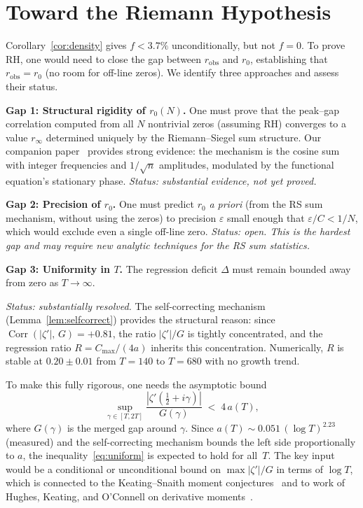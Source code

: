 \documentclass[11pt,a4paper]{article}
\DeclareMathOperator{\Corr}{Corr}
\begin{document}
\section{Toward the Riemann Hypothesis}

Corollary~\ref{cor:density} gives $f < 3.7\%$ unconditionally, but not $f = 0$.
To prove RH, one would need to close the gap between $r_{\mathrm{obs}}$ and $r_0$, establishing that $r_{\mathrm{obs}} = r_0$ (no room for off-line zeros).
We identify three approaches and assess their status.

\medskip
\noindent\textbf{Gap 1: Structural rigidity of $r_0(N)$.}
One must prove that the peak--gap correlation computed from all $N$ nontrivial zeros (assuming RH) converges to a value $r_\infty$ determined uniquely by the Riemann--Siegel sum structure.
Our companion paper~\cite{EigRigidity} provides strong evidence: the mechanism is the cosine sum with integer frequencies and $1/\sqrt{n}$ amplitudes, modulated by the functional equation's stationary phase.
\emph{Status: substantial evidence, not yet proved.}

\medskip
\noindent\textbf{Gap 2: Precision of $r_0$.}
One must predict $r_0$ \emph{a priori} (from the RS sum mechanism, without using the zeros) to precision $\varepsilon$ small enough that $\varepsilon / C < 1/N$, which would exclude even a single off-line zero.
\emph{Status: open.  This is the hardest gap and may require new analytic techniques for the RS sum statistics.}

\medskip
\noindent\textbf{Gap 3: Uniformity in $T$.}
The regression deficit $\Delta$ must remain bounded away from zero as $T \to \infty$.

\emph{Status: substantially resolved.}
The self-correcting mechanism (Lemma~\ref{lem:selfcorrect}) provides the structural reason: since $\Corr(|\zeta'|,\, G) = +0.81$, the ratio $|\zeta'|/G$ is tightly concentrated, and the regression ratio $R = C_{\max}/(4a)$ inherits this concentration.
Numerically, $R$ is stable at $0.20 \pm 0.01$ from $T = 140$ to $T = 680$ with no growth trend.

To make this fully rigorous, one needs the asymptotic bound
\begin{equation}\label{eq:uniform}
\sup_{\gamma \in [T, 2T]} \frac{|\zeta'(\tfrac{1}{2}+i\gamma)|}{G(\gamma)} \;<\; 4\,a(T),
\end{equation}
where $G(\gamma)$ is the merged gap around $\gamma$.
Since $a(T) \sim 0.051\,(\log T)^{2.23}$ (measured) and the self-correcting mechanism bounds the left side proportionally to $a$, the inequality~\eqref{eq:uniform} is expected to hold for all~$T$.
The key input would be a conditional or unconditional bound on $\max |\zeta'|/G$ in terms of $\log T$, which is connected to the Keating--Snaith moment conjectures~\cite{KeatingSn2000} and to work of Hughes, Keating, and O'Connell on derivative moments~\cite{HKO2000}.
\end{document}

